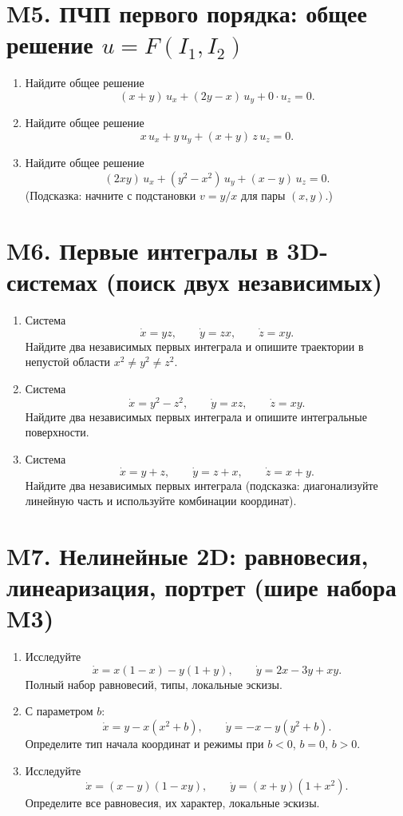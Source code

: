 \documentclass[12pt]{article}
\begin{document}
\section*{M5. ПЧП первого порядка: общее решение $u=F(I_1,I_2)$}
\begin{enumerate}
\item Найдите общее решение
\[
(x+y)\,u_x+(2y-x)\,u_y+0\cdot u_z=0.
\]

\item Найдите общее решение
\[
x\,u_x+y\,u_y+(x+y)\,z\,u_z=0.
\]

\item Найдите общее решение
\[
(2xy)\,u_x+(y^2-x^2)\,u_y+(x-y)\,u_z=0.
\]
(Подсказка: начните с подстановки $v=y/x$ для пары $(x,y)$.)
\end{enumerate}

\section*{M6. Первые интегралы в 3D-системах (поиск двух независимых)}
\begin{enumerate}
\item Система
\[
\dot x = yz,\qquad \dot y = zx,\qquad \dot z = xy.
\]
Найдите два независимых первых интеграла и опишите траектории в непустой области $x^2\ne y^2\ne z^2$.

\item Система
\[
\dot x = y^2-z^2,\qquad \dot y = xz,\qquad \dot z = xy.
\]
Найдите два независимых первых интеграла и опишите интегральные поверхности.

\item Система
\[
\dot x = y+z,\qquad \dot y = z+x,\qquad \dot z = x+y.
\]
Найдите два независимых первых интеграла (подсказка: диагонализуйте линейную часть и используйте комбинации координат).
\end{enumerate}

\section*{M7. Нелинейные 2D: равновесия, линеаризация, портрет (шире набора M3)}
\begin{enumerate}
\item Исследуйте
\[
\dot x = x(1-x)-y(1+y),\qquad
\dot y = 2x -3y + xy.
\]
Полный набор равновесий, типы, локальные эскизы.

\item С параметром $b$:
\[
\dot x = y - x(x^2+b),\qquad
\dot y = -x - y(y^2+b).
\]
Определите тип начала координат и режимы при $b<0$, $b=0$, $b>0$.

\item Исследуйте
\[
\dot x = (x-y)(1-xy),\qquad
\dot y = (x+y)(1+x^2).
\]
Определите все равновесия, их характер, локальные эскизы.
\end{enumerate}
\end{document}
